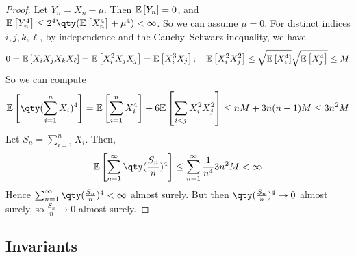 \begin{proof}
	Let $Y_n = X_n - \mu$.
	Then $\mathbb{E}\left[{Y_n}\right] = 0$, and $\expect{Y_n^4} \leq 2^4 \qty(\expect{X_n^4} + \mu^4) < \infty$.
	So we can assume $\mu = 0$.
	For distinct indices $i, j, k, \ell$, by independence and the Cauchy--Schwarz inequality, we have
	\begin{align*}
        0 = \mathbb{E}\left[{X_i X_j X_k X_\ell}\right] = \mathbb{E}\left[{X_i^2 X_j X_j}\right] = \mathbb{E}\left[{X_i^3 X_j}\right];\quad \mathbb{E}\left[{X_i^2 X_j^2}\right] \leq \sqrt{\mathbb{E}\left[{X_i^4}\right]}\sqrt{\mathbb{E}\left[{X_j^4}\right]} \leq M
    \end{align*}
	So we can compute
	\begin{align*}
		\expect{\qty(\sum_{i=1}^n X_i)^4} = \expect{\sum_{i=1}^n X_i^4} + 6\expect{\sum_{i < j} X_i^2 X_j^2} \leq nM + 3n(n-1)M \leq 3n^2 M
    \end{align*}
	Let $S_n = \sum_{i=1}^n X_i$.
	Then,
	\begin{align*}
        \expect{\sum_{n=1}^\infty \qty(\frac{S_n}{n})^4} \leq \sum_{n=1}^\infty \frac{1}{n^4} 3n^2 M < \infty
    \end{align*}
	Hence $\sum_{n=1}^\infty \qty(\frac{S_n}{n})^4 < \infty$ almost surely.
	But then $\qty(\frac{S_n}{n})^4 \to 0$ almost surely, so $\frac{S_n}{n} \to 0$ almost surely.
\end{proof}

\subsection{Invariants}

